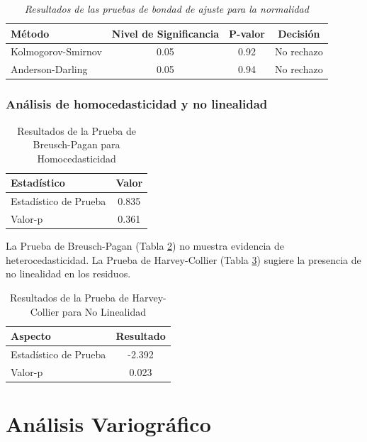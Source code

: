 \begin{table}[ht]
\centering
\caption{\textit{Resultados de las pruebas de bondad de ajuste para la normalidad}}
\label{tab:goodness_of_fit_tests}
\begin{tabular}{@{}lccc@{}}
\toprule
Método & Nivel de Significancia & P-valor & Decisión \\
\midrule
Kolmogorov-Smirnov & 0.05 & 0.92 & No rechazo \\
Anderson-Darling & 0.05 & 0.94 & No rechazo \\
\bottomrule
\end{tabular}
\end{table}

\subsubsection{Análisis de homocedasticidad y no linealidad}

\begin{table}[H]
\centering
\caption{Resultados de la Prueba de Breusch-Pagan para Homocedasticidad}
\label{tab:breusch_pagan_test}
\begin{tabular}{lc}
\toprule
Estadístico & Valor \\
\midrule
Estadístico de Prueba & 0.835 \\
Valor-p & 0.361 \\
\bottomrule
\end{tabular}
\end{table}

La Prueba de Breusch-Pagan (Tabla \ref{tab:breusch_pagan_test}) no muestra evidencia de heterocedasticidad. La Prueba de Harvey-Collier (Tabla \ref{tab:harvey_collier_test}) sugiere la presencia de no linealidad en los residuos.

\begin{table}[H]
\centering
\caption{Resultados de la Prueba de Harvey-Collier para No Linealidad}
\label{tab:harvey_collier_test}
\begin{tabular}{lc}
\toprule
Aspecto & Resultado \\
\midrule
Estadístico de Prueba & -2.392 \\
Valor-p & 0.023 \\
\bottomrule
\end{tabular}
\end{table}
 

\section{Análisis Variográfico}

